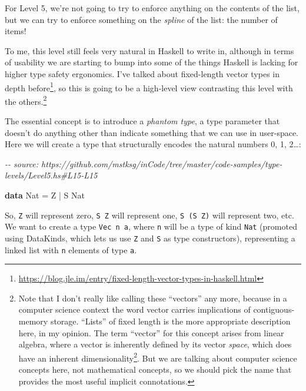 \documentclass[]{article}
\newenvironment{Shaded}{}{}
\newcommand{\CommentTok}[1]{\textcolor[rgb]{0.38,0.63,0.69}{\textit{#1}}}
\newcommand{\DataTypeTok}[1]{\textcolor[rgb]{0.56,0.13,0.00}{#1}}
\newcommand{\KeywordTok}[1]{\textcolor[rgb]{0.00,0.44,0.13}{\textbf{#1}}}
\newcommand{\OperatorTok}[1]{\textcolor[rgb]{0.40,0.40,0.40}{#1}}
\newcommand{\OtherTok}[1]{\textcolor[rgb]{0.00,0.44,0.13}{#1}}
\renewcommand{\href}[2]{#2\footnote{\url{#1}}}
\begin{document}
For Level 5, we're not going to try to enforce anything on the contents of the
list, but we can try to enforce something on the \emph{spline} of the list: the
number of items!

To me, this level still feels very natural in Haskell to write in, although in
terms of usability we are starting to bump into some of the things Haskell is
lacking for higher type safety ergonomics. I've talked about
\href{https://blog.jle.im/entry/fixed-length-vector-types-in-haskell.html}{fixed-length
vector types in depth before}, so this is going to be a high-level view
contrasting this level with the others.\footnote{Note that I don't really like
  calling these ``vectors'' any more, because in a computer science context the
  word vector carries implications of contiguous-memory storage. ``Lists'' of
  fixed length is the more appropriate description here, in my opinion. The term
  ``vector'' for this concept arises from linear algebra, where a vector is
  inherently defined by its vector \emph{space}, which
  \href{https://en.wikipedia.org/wiki/Dimension_theorem_for_vector_spaces}{does
  have an inherent dimensionality}. But we are talking about computer science
  concepts here, not mathematical concepts, so we should pick the name that
  provides the most useful implicit connotations.}

The essential concept is to introduce a \emph{phantom type}, a type parameter
that doesn't do anything other than indicate something that we can use in
user-space. Here we will create a type that structurally encodes the natural
numbers 0, 1, 2\ldots:

\begin{Shaded}
\begin{Highlighting}[]
\CommentTok{{-}{-} source: https://github.com/mstksg/inCode/tree/master/code{-}samples/type{-}levels/Level5.hs\#L15{-}L15}

\KeywordTok{data} \DataTypeTok{Nat} \OtherTok{=} \DataTypeTok{Z} \OperatorTok{|} \DataTypeTok{S} \DataTypeTok{Nat}
\end{Highlighting}
\end{Shaded}

So, \texttt{Z} will represent zero, \texttt{S\ Z} will represent one,
\texttt{S\ (S\ Z)} will represent two, etc. We want to create a type
\texttt{Vec\ n\ a}, where \texttt{n} will be a type of kind \texttt{Nat}
(promoted using DataKinds, which lets us use \texttt{Z} and \texttt{S} as type
constructors), representing a linked list with \texttt{n} elements of type
\texttt{a}.
\end{document}
